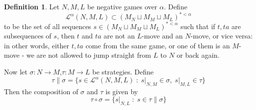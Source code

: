 \documentclass[11pt]{article} %
\theoremstyle{plain} %
\theoremstyle{definition} %
\newtheorem{definition}[theorem]{Definition}
\theoremstyle{exercisestyle}
\newcommand*\from{\colon}
\newcommand{\cmap}[3]{#1\from{}#2\to{}#3}
\newcommand{\comp}[2]{#1 \circ #2}
\newcommand{\cprd}{\sqcup}
\newcommand{\suchthat}{\;\colon\;}
\renewcommand{\L}{\mathcal L}
\begin{document}
\begin{definition}
  Let $N,M,L$ be negative games over $\alpha$.  Define
  \[
    \L^\alpha(N,M,L)\subset(M_N\cprd M_M\cprd M_L)^{*<\alpha}
  \]
  to be the set of all sequences $s\in(M_N\cprd M_M\cprd M_L)^{*<\alpha}$ such that if $t,ta$ are subsequences of $s$, then $t$ and $ta$ are not an $L$-move and an $N$-move, or vice versa: in other words, either $t,ta$ come from the same game, or one of them is an $M$-move - we are not allowed to jump straight from $L$ to $N$ or back again.
  
  Now let $\cmap{\sigma}{N}{M}$,$\cmap{\tau}{M}{L}$ be strategies.  Define
  \[
    \tau\|\sigma = \{s\in\L^\alpha(N,M,L)\suchthat s\vert_{N,M}\in \sigma,\; s\vert_{M,L}\in\tau\}
  \]
  Then the composition of $\sigma$ and $\tau$ is given by
  \[
    \comp\tau\sigma=\{s\vert_{N,L}\suchthat s\in\tau\|\sigma\}
  \]
\end{definition}
\end{document}
